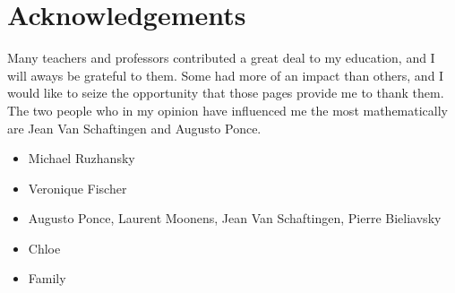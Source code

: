 \chapter*{Acknowledgements}

Many teachers and professors contributed a great deal to my education,
and I will aways be grateful to them.
Some had more of an impact than others,
and I would like to seize the opportunity that those pages provide me to thank them.
The two people who in my opinion have influenced me the most mathematically are Jean Van Schaftingen and Augusto Ponce.

\begin{itemize}
    \item Michael Ruzhansky
    \item Veronique Fischer
    \item Augusto Ponce, Laurent Moonens, Jean Van Schaftingen, Pierre Bieliavsky
    \item Chloe
    \item Family
\end{itemize}
